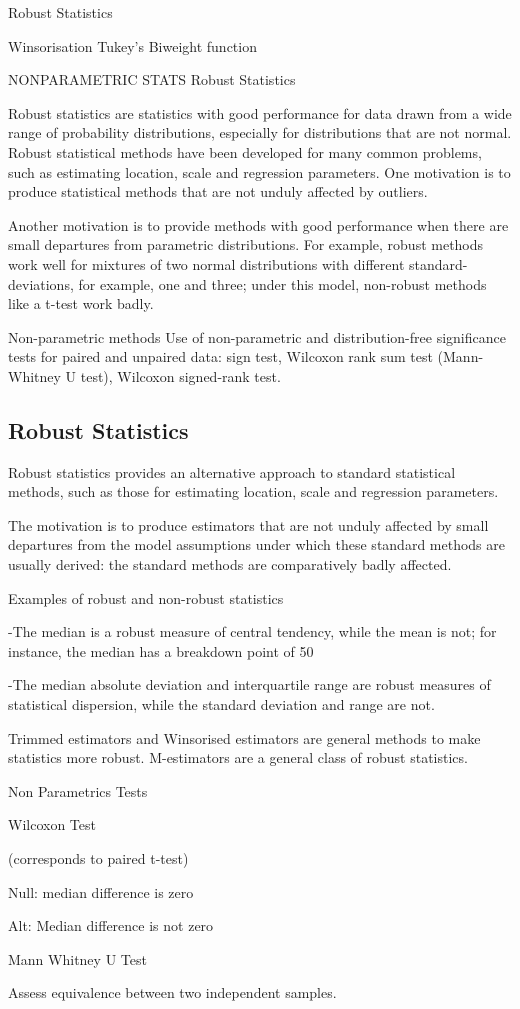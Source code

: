 Robust Statistics

Winsorisation
Tukey's Biweight function


NONPARAMETRIC STATS
Robust Statistics

Robust statistics are statistics with good performance for data drawn from a wide range of probability distributions, especially for distributions that are not normal. Robust statistical methods have been developed for many common problems, such as estimating location, scale and regression parameters. One motivation is to produce statistical methods that are not unduly affected by outliers.

Another motivation is to provide methods with good performance when there are small departures from parametric distributions. For example, robust methods work well for mixtures of two normal distributions with different standard-deviations, for example, one and three; under this model, non-robust methods like a t-test work badly.

Non-parametric methods
Use of non-parametric and distribution-free significance tests for paired and unpaired data: sign test, Wilcoxon rank sum test (Mann-Whitney U test), Wilcoxon signed-rank test.


\subsection*{Robust Statistics}

Robust statistics provides an alternative approach to standard statistical methods, such as those for estimating location, scale and regression parameters. 


The motivation is to produce estimators that are not unduly affected by small departures from the model assumptions under which these standard methods are usually derived: the standard methods are comparatively badly affected.


Examples of robust and non-robust statistics

 -The median is a robust measure of central tendency, while the mean is not; for instance, the median has a breakdown point of 50%

 -The median absolute deviation and interquartile range are robust measures of statistical dispersion, while the standard deviation and range are not.


Trimmed estimators and Winsorised estimators are general methods to make statistics more robust. M-estimators are a general class of robust statistics.

Non Parametrics Tests


Wilcoxon Test 


(corresponds to paired t-test) 


Null: median difference is zero

Alt: Median difference is not zero


Mann Whitney U Test

Assess equivalence between two independent samples.

